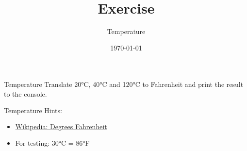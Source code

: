 


\title{Exercise}
\subtitle{Temperature}
\date{\today}




\begin{frame}
    \titlepage
\end{frame}

\begin{frame}{Temperature}
    Translate 20°C, 40°C and 120°C to Fahrenheit and print the result to the console.
\end{frame}

\begin{frame}{Temperature}
    Hints:
    \begin{itemize}
        \item \hyperlink{https://de.wikipedia.org/wiki/Grad_Fahrenheit}{Wikipedia: Degrees Fahrenheit}
        \item For testing: 30°C = 86°F
    \end{itemize}
\end{frame}



